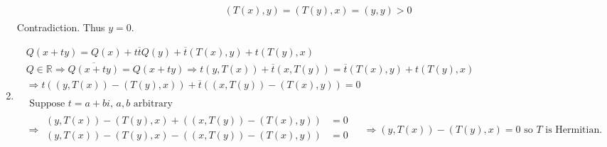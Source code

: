 \documentclass[twoside]{amsart}
\theoremstyle{plain}
\theoremstyle{definition}
\begin{document}
\begin{enumerate}
\[\begin{gathered}
\begin{aligned}
     & (T(x),y) = (T(y),x) = (y,y) > 0 
  \end{aligned}
\end{gathered}
\]
Contradiction.  Thus $y=0$.  
\item \[
\begin{gathered}
  Q(x+ty) = Q(x) + t\overline{t}Q(y) + \overline{t}(T(x),y) + t(T(y),x) \\
  Q \in \mathbb{R} \Longrightarrow  \overline{Q(x+ty)} = Q(x+ty) \Longrightarrow t(y,T(x)) + \overline{t} (x,T(y)) = \overline{t} (T(x),y) + t(T(y),x) \\
  \Longrightarrow t((y,T(x)) - (T(y),x)) + \overline{t} ((x,T(y)) - (T(x),y)) = 0  \\
\quad \\
\text{ Suppose $t = a+bi$, $a,b$ arbitrary } \\
\Longrightarrow \begin{aligned} 
  (y,T(x)) - (T(y),x) + ((x,T(y))- (T(x),y)) &= 0 \\ 
  (y,T(x)) - (T(y),x) - ((x,T(y))- (T(x),y)) &= 0 \\
\end{aligned} \quad \, \Longrightarrow (y,T(x)) - (T(y),x) = 0 \text{ so $T$ is Hermitian.}
\end{gathered}
\]
\end{enumerate}
\end{document}
